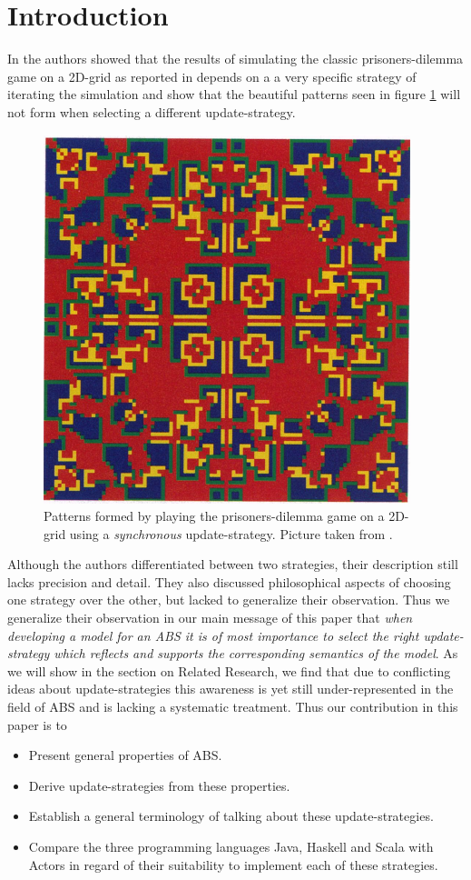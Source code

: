 \section{Introduction}
In \cite{huberman_evolutionary_1993} the authors showed that the results of simulating the classic prisoners-dilemma game on a 2D-grid as reported in \cite{nowak_evolutionary_1992} depends on a a very specific strategy of iterating the simulation and show that the beautiful patterns seen in figure \ref{fig:sync_patterns} will not form when selecting a different update-strategy.

\begin{figure}[H]
	\centering
  \includegraphics[width=.4\textwidth, angle=0]{./fig/sync_patterns.png}
	\caption{Patterns formed by playing the prisoners-dilemma game on a 2D-grid using a \textit{synchronous} update-strategy. Picture taken from \cite{huberman_evolutionary_1993}.}
	\label{fig:sync_patterns}
\end{figure}

Although the authors differentiated between two strategies, their description still lacks precision and detail. They also discussed philosophical aspects of choosing one strategy over the other, but lacked to generalize their observation. Thus we generalize their observation in our main message of this paper that \textit{when developing a model for an ABS it is of most importance to select the right update-strategy which reflects and supports the corresponding semantics of the model}. As we will show in the section on Related Research, we find that due to conflicting ideas about update-strategies this awareness is yet still under-represented in the field of ABS and is lacking a systematic treatment. Thus our contribution in this paper is to
\begin{itemize}
	\item Present general properties of ABS.
	\item Derive update-strategies from these properties.
	\item Establish a general terminology of talking about these update-strategies.
	\item Compare the three programming languages Java, Haskell and Scala with Actors in regard of their suitability to implement each of these strategies.
\end{itemize}

